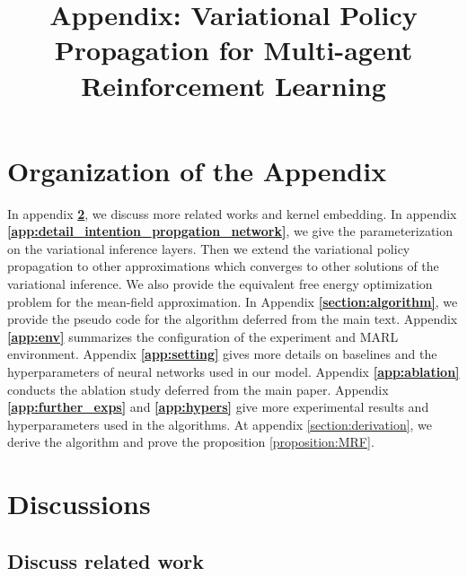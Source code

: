 \documentclass[11pt,a4paper]{article}
\theoremstyle{definition}
\begin{document}





\onecolumn
\newpage
\appendix
\title{\bf Appendix: Variational Policy Propagation for Multi-agent Reinforcement Learning  }
\date{}
\author{}
\maketitle


\section{Organization of the Appendix}

In appendix \textbf{\ref{app:more_related_work}}, we discuss more related works and kernel embedding.
In appendix\textbf{ \ref{app:detail_intention_propgation_network}}, we give the parameterization on the variational inference layers. Then we extend the variational policy propagation to other approximations which converges to other solutions of the variational inference. We also provide the equivalent free energy optimization problem for the mean-field approximation.  In Appendix  \textbf{\ref{section:algorithm}}, we provide the pseudo code for the algorithm deferred from the main text. Appendix \textbf{\ref{app:env}} summarizes the configuration of the experiment and MARL environment. Appendix \textbf{\ref{app:setting}} gives more details on baselines and the hyperparameters of neural networks used in our model. Appendix \textbf{\ref{app:ablation}} conducts the ablation study deferred from the main paper. Appendix \textbf{\ref{app:further_exps}} and \textbf{\ref{app:hypers}} give more experimental results and hyperparameters used in the algorithms. At appendix \ref{section:derivation}, we derive the algorithm and prove the proposition \ref{proposition:MRF}.

\section{ Discussions}\label{app:more_related_work}
\subsection{Discuss related work}
\end{document}
